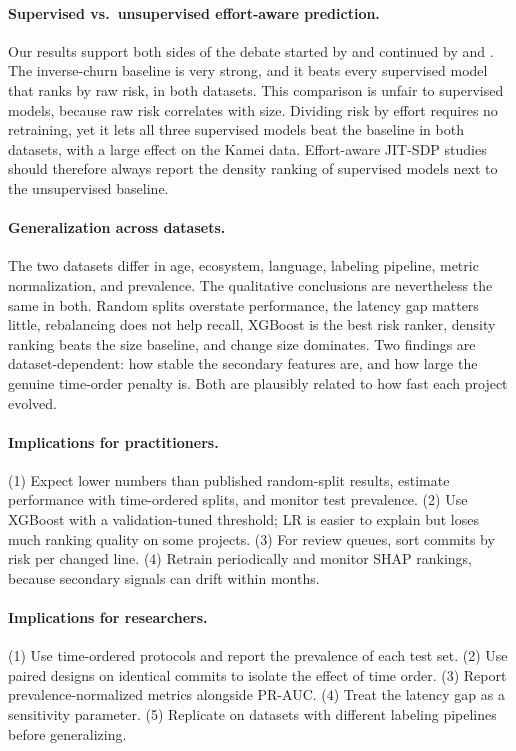 \paragraph{Supervised vs.\ unsupervised effort-aware prediction.} Our results support both sides of the debate started by \citet{yang2016} and continued by \citet{fu2017} and \citet{huang2019}. The inverse-churn baseline is very strong, and it beats every supervised model that ranks by raw risk, in both datasets. This comparison is unfair to supervised models, because raw risk correlates with size. Dividing risk by effort requires no retraining, yet it lets all three supervised models beat the baseline in both datasets, with a large effect on the Kamei data. Effort-aware JIT-SDP studies should therefore always report the density ranking of supervised models next to the unsupervised baseline.

\paragraph{Generalization across datasets.} The two datasets differ in age, ecosystem, language, labeling pipeline, metric normalization, and prevalence. The qualitative conclusions are nevertheless the same in both. Random splits overstate performance, the latency gap matters little, rebalancing does not help recall, XGBoost is the best risk ranker, density ranking beats the size baseline, and change size dominates. Two findings are dataset-dependent: how stable the secondary features are, and how large the genuine time-order penalty is. Both are plausibly related to how fast each project evolved.

\paragraph{Implications for practitioners.} (1) Expect lower numbers than published random-split results, estimate performance with time-ordered splits, and monitor test prevalence. (2) Use XGBoost with a validation-tuned threshold; LR is easier to explain but loses much ranking quality on some projects. (3) For review queues, sort commits by risk per changed line. (4) Retrain periodically and monitor SHAP rankings, because secondary signals can drift within months.

\paragraph{Implications for researchers.} (1) Use time-ordered protocols and report the prevalence of each test set. (2) Use paired designs on identical commits to isolate the effect of time order. (3) Report prevalence-normalized metrics alongside PR-AUC. (4) Treat the latency gap as a sensitivity parameter. (5) Replicate on datasets with different labeling pipelines before generalizing.

